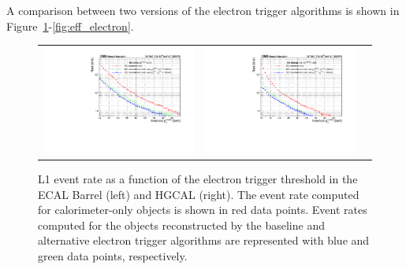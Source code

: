 A comparison between two versions of the electron trigger algorithms is shown in Figure~\ref{fig:rate_electron}-\ref{fig:eff_electron}. 

 \begin{figure}[tbh!]
 \begin{center}
 \begin{tabular}{ccc}
  \includegraphics[width=.45\linewidth]{figures/Part2/Upgrade/Rate_barrel}&
  \includegraphics[width=.45\linewidth]{figures/Part2/Upgrade/Rate_endcap}&
 \end{tabular}
 \caption{\ac{L1} event rate as a function of the electron trigger threshold in the \ac{ECAL} Barrel (left) and \ac{HGCAL} (right). The event rate computed for calorimeter-only objects is shown in red data points. Event rates computed for the objects reconstructed by the baseline and alternative electron trigger algorithms are represented with blue and green data points, respectively.}
 \label{fig:rate_electron}
 \end{center}
\end{figure}

